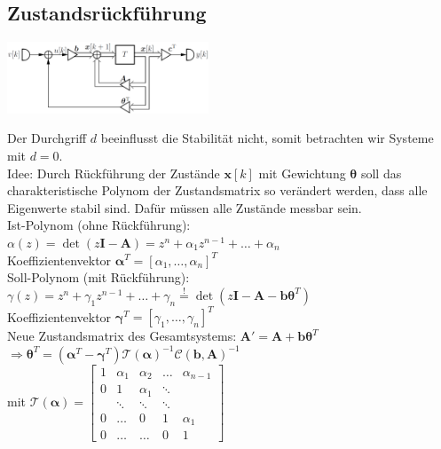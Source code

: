 \documentclass[a4paper,landscape,6pt]{article}
\newcommand{\ma}[1]{\ensuremath{\boldsymbol {#1}}}								%
\newcommand{\mat}[1]{\ensuremath{\begin{bmatrix} #1 \end{bmatrix}}}				%
\renewcommand{\vec}[1]{\ensuremath{\boldsymbol {#1}}}							%
\begin{document}
\begin{multicols}{3}
\subsection*{Zustandsrückführung}
	\begin{minipage}[t]{0.5\textwidth}
	\hspace{1 cm}
	\includegraphics[width=0.45\textwidth]{images_ssp/statefeedback}\\
\end{minipage}
Der Durchgriff $d$ beeinflusst die Stabilität nicht, somit betrachten wir Systeme mit $d=0$.\\
Idee: Durch Rückführung der Zustände $\vec x[k]$ mit Gewichtung $\vec \theta$ soll das charakteristische Polynom der Zustandsmatrix so verändert werden, dass alle Eigenwerte stabil sind. Dafür müssen alle Zustände messbar sein.\\

Ist-Polynom (ohne Rückführung):\\
$\alpha(z) = \det(z\ma I - \ma A) = z^n + \alpha_1 z^{n-1} + \dots + \alpha_n$\\
Koeffizientenvektor $\vec \alpha ^T = [\alpha_1,\dots,\alpha_n]^T$\\

Soll-Polynom (mit Rückführung):\\
$\gamma(z) = z^n + \gamma_1 z^{n-1} + \dots + \gamma_n \overset{!}{=}  \det(z\ma I - \ma A - \vec b \vec \theta ^T)$\\
Koeffizientenvektor $\vec \gamma ^T = [\gamma_1,\dots,\gamma_n]^T$\\
Neue Zustandsmatrix des Gesamtsystems: $\ma A' = \ma A + \vec b \vec \theta ^T$\\

$\Rightarrow \boxed{\vec \theta ^T = (\vec \alpha ^T - \vec \gamma ^T) \ma{\mathcal{T}}(\vec \alpha)^{-1} \ma{\mathcal{C}}(\vec b, \ma A)^{-1}}$\\

mit $\ma{\mathcal{T}}(\vec \alpha) = \mat{1 & \alpha_1 & \alpha_2 & \dots & \alpha_{n-1} \\ 0 & 1 & \alpha_1 & \ddots & \\ & \ddots & \ddots & \ddots & \\ 0 & \dots & 0 & 1 & \alpha_1 \\ 0 & \dots & \dots  & 0 & 1}$\\


\end{multicols}
\end{document}
